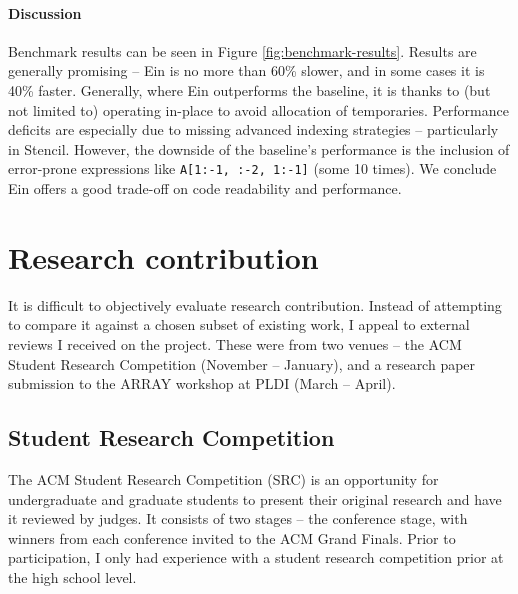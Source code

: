 \paragraph{Discussion} Benchmark results can be seen in Figure \ref{fig:benchmark-results}. Results are generally promising -- Ein is no more than 60\% slower, and in some cases it is 40\% faster. 
Generally, where Ein outperforms the baseline, it is thanks to (but not limited to) operating in-place to avoid allocation of temporaries. 
Performance deficits are especially due to missing advanced indexing strategies -- particularly in Stencil. 
However, the downside of the baseline's performance is the inclusion of error-prone expressions like \texttt{A[1:-1, :-2, 1:-1]} (some 10 times).
We conclude Ein offers a good trade-off on code readability and performance.

\todothis




\needspace{5em}
\section{Research contribution}

It is difficult to objectively evaluate research contribution. 
Instead of attempting to compare it against a chosen subset of existing work, I appeal to external reviews I received on the project. 
These were from two venues -- the ACM Student Research Competition (November -- January), and a research paper submission to the ARRAY workshop at PLDI (March -- April).

\subsection{Student Research Competition}

The ACM Student Research Competition (SRC) is an opportunity for undergraduate and graduate students to present their original research and have it reviewed by judges. 
It consists of two stages -- the conference stage, with winners from each conference invited to the ACM Grand Finals. 
Prior to participation, I only had experience with a student research competition prior at the high school level.

